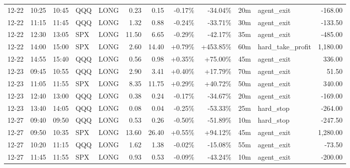\documentclass[11pt,a4paper,twoside]{article}
\begin{document}
\begin{center}
\begin{longtable}{>{\color{txtmain}}l l l l l r r r r r >{\color{txtmain}}l r}
12-22 & 10:25 & 10:45 & QQQ & LONG & 0.23 & 0.15 & \textcolor{lossred}{-0.17\%} & \textcolor{lossred}{-34.04\%} & 20m & agent\_exit & \textcolor{lossred}{-168.00} \\
12-22 & 11:15 & 11:45 & QQQ & LONG & 1.32 & 0.88 & \textcolor{lossred}{-0.24\%} & \textcolor{lossred}{-33.71\%} & 30m & agent\_exit & \textcolor{lossred}{-133.50} \\
12-22 & 12:30 & 13:05 & SPX & LONG & 11.50 & 6.65 & \textcolor{lossred}{-0.29\%} & \textcolor{lossred}{-42.17\%} & 35m & agent\_exit & \textcolor{lossred}{-485.00} \\
12-22 & 14:00 & 15:00 & SPX & LONG & 2.60 & 14.40 & \textcolor{wingreen}{+0.79\%} & \textcolor{wingreen}{+453.85\%} & 60m & hard\_take\_profit & \textcolor{wingreen}{1,180.00} \\
12-22 & 14:55 & 15:40 & QQQ & LONG & 0.56 & 0.98 & \textcolor{wingreen}{+0.35\%} & \textcolor{wingreen}{+75.00\%} & 45m & agent\_exit & \textcolor{wingreen}{336.00} \\
12-23 & 09:45 & 10:55 & QQQ & LONG & 2.90 & 3.41 & \textcolor{wingreen}{+0.40\%} & \textcolor{wingreen}{+17.79\%} & 70m & agent\_exit & \textcolor{wingreen}{51.50} \\
12-23 & 11:05 & 11:55 & SPX & LONG & 8.35 & 11.75 & \textcolor{wingreen}{+0.29\%} & \textcolor{wingreen}{+40.72\%} & 50m & agent\_exit & \textcolor{wingreen}{340.00} \\
12-23 & 12:40 & 13:00 & QQQ & LONG & 0.38 & 0.24 & \textcolor{lossred}{-0.17\%} & \textcolor{lossred}{-34.67\%} & 20m & agent\_exit & \textcolor{lossred}{-169.00} \\
12-23 & 13:40 & 14:05 & QQQ & LONG & 0.08 & 0.04 & \textcolor{lossred}{-0.25\%} & \textcolor{lossred}{-53.33\%} & 25m & hard\_stop & \textcolor{lossred}{-264.00} \\
12-27 & 09:40 & 09:50 & QQQ & LONG & 0.53 & 0.26 & \textcolor{lossred}{-0.50\%} & \textcolor{lossred}{-51.89\%} & 10m & hard\_stop & \textcolor{lossred}{-247.50} \\
12-27 & 09:50 & 10:35 & SPX & LONG & 13.60 & 26.40 & \textcolor{wingreen}{+0.55\%} & \textcolor{wingreen}{+94.12\%} & 45m & agent\_exit & \textcolor{wingreen}{1,280.00} \\
12-27 & 10:20 & 11:15 & QQQ & LONG & 1.62 & 1.38 & \textcolor{lossred}{-0.02\%} & \textcolor{lossred}{-15.08\%} & 55m & agent\_exit & \textcolor{lossred}{-73.50} \\
12-27 & 11:45 & 11:55 & SPX & LONG & 0.93 & 0.53 & \textcolor{lossred}{-0.09\%} & \textcolor{lossred}{-43.24\%} & 10m & agent\_exit & \textcolor{lossred}{-200.00} \\

\end{longtable}
\end{center}
\end{document}
